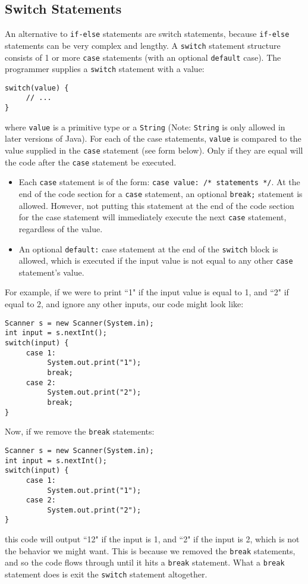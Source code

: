 \subsection{Switch Statements}
An alternative to \verb|if-else| statements are switch statements, because \verb|if-else| statements can be very complex and lengthy. A \verb|switch| statement structure consists of 1 or more \verb|case| statements (with an optional \verb|default| case). The programmer supplies a \verb|switch| statement with a value:
\begin{lstlisting}
switch(value) {
     // ...
}
\end{lstlisting}
where \verb|value| is a primitive type or a \verb|String| (Note: \verb|String| is only allowed in later versions of Java). For each of the case statements, \verb|value| is compared to the value supplied in the \verb|case| statement (see form below). Only if they are equal will the code after the \verb|case| statement be executed.
\begin{itemize}
\item Each \verb|case| statement is of the form: \verb|case value: /* statements */|. At the end of the code section for a \verb|case| statement, an optional \verb|break;| statement is allowed. However, not putting this statement at the end of the code section for the case statement will immediately execute the next \verb|case| statement, regardless of the value.
\item An optional \verb|default:| case statement at the end of the \verb|switch| block is allowed, which is executed if the input value is not equal to any other \verb|case| statement's value.
\end{itemize}
For example, if we were to print ``1" if the input value is equal to 1, and ``2" if equal to 2, and ignore any other inputs, our code might look like:
\begin{lstlisting}
Scanner s = new Scanner(System.in);
int input = s.nextInt();
switch(input) {
     case 1:
          System.out.print("1");
          break;
     case 2:
          System.out.print("2");
          break;
}
\end{lstlisting}
Now, if we remove the \verb|break| statements:
\begin{lstlisting}
Scanner s = new Scanner(System.in);
int input = s.nextInt();
switch(input) {
     case 1:
          System.out.print("1");
     case 2:
          System.out.print("2");
}
\end{lstlisting}
this code will output ``12" if the input is 1, and ``2" if the input is 2, which is not the behavior we might want. This is because we removed the \verb|break| statements, and so the code flows through until it hits a \verb|break| statement. What a \verb|break| statement does is exit the \verb|switch| statement altogether.

